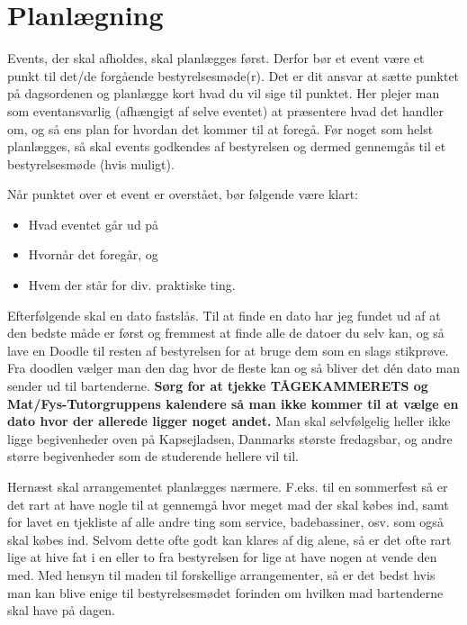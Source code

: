 \section*{Planlægning}
\label{sec:det-praktiske}

Events, der skal afholdes, skal planlægges først. Derfor bør et event være et punkt til det/de forgående bestyrelsesmøde(r). Det er dit ansvar at sætte punktet på dagsordenen og planlægge kort hvad du vil sige til punktet. Her plejer man som eventansvarlig (afhængigt af selve eventet) at præsentere hvad det handler om, og så ens plan for hvordan det kommer til at foregå. Før noget som helst planlægges, så skal events godkendes af bestyrelsen og dermed gennemgås til et bestyrelsesmøde (hvis muligt).

Når punktet over et event er overstået, bør følgende være klart:
\begin{itemize}
\item Hvad eventet går ud på
\item Hvornår det foregår, og
\item Hvem der står for div. praktiske ting.
\end{itemize}

\noindent Efterfølgende skal en dato fastslås. Til at finde en dato har jeg fundet ud af at den bedste måde er først og fremmest at finde alle de datoer du selv kan, og så lave en Doodle til resten af bestyrelsen for at bruge dem som en slags stikprøve. Fra doodlen vælger man den dag hvor de fleste kan og så bliver det dén dato man sender ud til bartenderne. \textbf{Sørg for at tjekke TÅGEKAMMERETS og Mat/Fys-Tutorgruppens kalendere så man ikke kommer til at vælge en dato hvor der allerede ligger noget andet.} Man skal selvfølgelig heller ikke ligge begivenheder oven på Kapsejladsen, Danmarks største fredagsbar, og andre større begivenheder som de studerende hellere vil til. 

Hernæst skal arrangementet planlægges nærmere. F.eks. til en sommerfest så er det rart at have nogle til at gennemgå hvor meget mad der skal købes ind, samt for lavet en tjekliste af alle andre ting som service, badebassiner, osv. som også skal købes ind. Selvom dette ofte godt kan klares af dig alene, så er det ofte rart lige at hive fat i en eller to fra bestyrelsen for lige at have nogen at vende den med. Med hensyn til maden til forskellige arrangementer, så er det bedst hvis man kan blive enige til bestyrelsesmødet forinden om hvilken mad bartenderne skal have på dagen.

